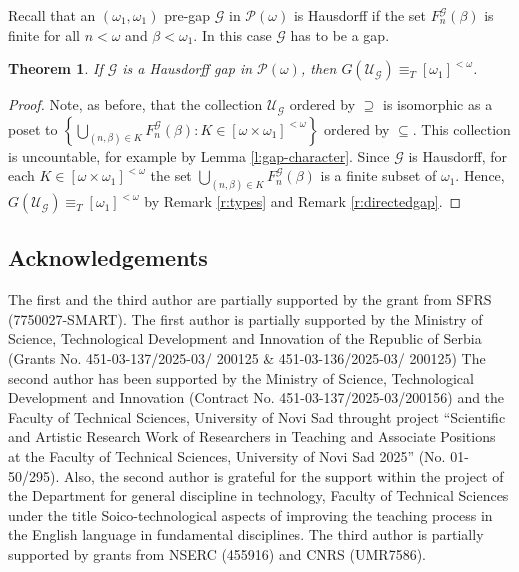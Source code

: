 \documentclass{amsart}
\theoremstyle{plain}
\newtheorem{theorem}{Theorem}[section]
\theoremstyle{definition}
\numberwithin{equation}{section}
\renewcommand{\b}{\beta}
\renewcommand{\o}{\omega}
\newcommand{\sst}{\subseteq}
\newcommand{\cu}{\mathcal U}
\newcommand{\cp}{\mathcal P}
\newcommand{\set}[1]{\left\{#1\right\}}
\begin{document}
Recall that an $(\o_1,\o_1)$ pre-gap $\mathcal G$ in $\cp(\o)$ is Hausdorff if the set $F^{\mathcal G}_n(\b)$ is finite for all $n<\o$ and $\b<\o_1$. In this case $\mathcal G$ has to be a gap.

\begin{theorem}
	If $\mathcal G$ is a Hausdorff gap in $\cp(\o)$, then $G(\cu_{\mathcal G})\equiv_T [\o_1]^{<\o}$.
\end{theorem}
\begin{proof}
	Note, as before, that the collection $\cu_{\mathcal G}$ ordered by $\supseteq$ is isomorphic as a poset to $\set{\bigcup_{(n,\b)\in K}F^{\mathcal G}_n(\b): K\in \left[\o\times\o_1\right]^{<\o}}$ ordered by $\sst$.
	This collection is uncountable, for example by Lemma \ref{l:gap-character}.
	Since $\mathcal G$ is Hausdorff, for each $K\in \left[\o\times\o_1\right]^{<\o}$ the set $\bigcup_{(n,\b)\in K}F^{\mathcal G}_n(\b)$ is a finite subset of $\o_1$.
	Hence, $G(\cu_{\mathcal G})\equiv_T [\o_1]^{<\o}$ by Remark \ref{r:types} and Remark \ref{r:directedgap}.
\end{proof}

\subsection*{Acknowledgements}
The first and the third author are partially supported by the grant from SFRS (7750027-SMART).
The first author is partially supported by the Ministry of Science, Technological Development and Innovation of the Republic of Serbia (Grants No. 451-03-137/2025-03/ 200125 \& 451-03-136/2025-03/ 200125)
The second author has been supported by the Ministry of Science, Technological Development and Innovation (Contract No. 451-03-137/2025-03/200156) and the Faculty of Technical Sciences, University of Novi Sad throught project “Scientific and Artistic Research Work of Researchers in Teaching and Associate Positions at the Faculty of Technical Sciences, University of Novi Sad 2025” (No. 01-50/295).
Also, the second author is grateful for the support within the project of the Department for general discipline in technology, Faculty of Technical Sciences under the title Soico-technological aspects of improving the teaching process in the English language in fundamental disciplines.
The third author is partially supported by grants from NSERC (455916) and CNRS (UMR7586).




\end{document}
